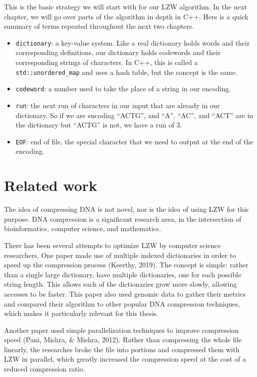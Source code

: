 \documentclass[12pt,twoside]{reedthesis}
\providecommand{\tightlist}{%
  \setlength{\itemsep}{0pt}\setlength{\parskip}{0pt}}
\begin{document}
This is the basic strategy we will start with for our LZW algorithm. In the next chapter, we will go over parts of the algorithm in depth in C++. Here is a quick summary of terms repeated throughout the next two chapters.
\begin{itemize}
\tightlist
\item
  \texttt{dictionary}: a key-value system. Like a real dictionary holds words and their corresponding definitions, our dictionary holds codewords and their corresponding strings of characters. In C++, this is called a \texttt{std::unordered\_map} and uses a hash table, but the concept is the same.
\item
  \texttt{codeword}: a number used to take the place of a string in our encoding.
\item
  \texttt{run}: the next run of characters in our input that are already in our dictionary. So if we are encoding ``ACTG'', and ``A'', ``AC'', and ``ACT'' are in the dictionary but ``ACTG'' is not, we have a run of 3.
\item
  \texttt{EOF}: end of file, the special character that we need to output at the end of the encoding.
\end{itemize}
\hypertarget{related-work}{%
\section{Related work}\label{related-work}}

The idea of compressing DNA is not novel, nor is the idea of using LZW for this purpose. DNA compression is a significant research area, in the intersection of bioinformatics, computer science, and mathematics.

There has been several attempts to optimize LZW by computer science researchers. One paper made use of multiple indexed dictionaries in order to speed up the compression process (Keerthy, 2019). The concept is simple: rather than a single large dictionary, have multiple dictionaries, one for each possible string length. This allows each of the dictionaries grow more slowly, allowing accesses to be faster. This paper also used genomic data to gather their metrics and compared their algorithm to other popular DNA compression techniques, which makes it particularly relevant for this thesis.

Another paper used simple parallelization techniques to improve compression speed (Pani, Mishra, \& Mishra, 2012). Rather than compressing the whole file linearly, the researches broke the file into portions and compressed them with LZW in parallel, which greatly increased the compression speed at the cost of a reduced compression ratio.
\end{document}
